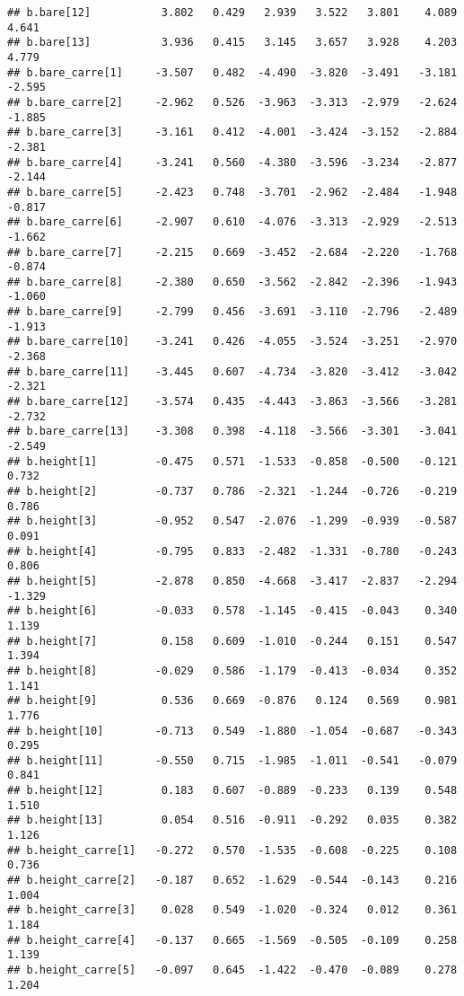 \documentclass[
]{article}
\begin{document}
\begin{verbatim}
## b.bare[12]           3.802   0.429   2.939   3.522   3.801    4.089    4.641
## b.bare[13]           3.936   0.415   3.145   3.657   3.928    4.203    4.779
## b.bare_carre[1]     -3.507   0.482  -4.490  -3.820  -3.491   -3.181   -2.595
## b.bare_carre[2]     -2.962   0.526  -3.963  -3.313  -2.979   -2.624   -1.885
## b.bare_carre[3]     -3.161   0.412  -4.001  -3.424  -3.152   -2.884   -2.381
## b.bare_carre[4]     -3.241   0.560  -4.380  -3.596  -3.234   -2.877   -2.144
## b.bare_carre[5]     -2.423   0.748  -3.701  -2.962  -2.484   -1.948   -0.817
## b.bare_carre[6]     -2.907   0.610  -4.076  -3.313  -2.929   -2.513   -1.662
## b.bare_carre[7]     -2.215   0.669  -3.452  -2.684  -2.220   -1.768   -0.874
## b.bare_carre[8]     -2.380   0.650  -3.562  -2.842  -2.396   -1.943   -1.060
## b.bare_carre[9]     -2.799   0.456  -3.691  -3.110  -2.796   -2.489   -1.913
## b.bare_carre[10]    -3.241   0.426  -4.055  -3.524  -3.251   -2.970   -2.368
## b.bare_carre[11]    -3.445   0.607  -4.734  -3.820  -3.412   -3.042   -2.321
## b.bare_carre[12]    -3.574   0.435  -4.443  -3.863  -3.566   -3.281   -2.732
## b.bare_carre[13]    -3.308   0.398  -4.118  -3.566  -3.301   -3.041   -2.549
## b.height[1]         -0.475   0.571  -1.533  -0.858  -0.500   -0.121    0.732
## b.height[2]         -0.737   0.786  -2.321  -1.244  -0.726   -0.219    0.786
## b.height[3]         -0.952   0.547  -2.076  -1.299  -0.939   -0.587    0.091
## b.height[4]         -0.795   0.833  -2.482  -1.331  -0.780   -0.243    0.806
## b.height[5]         -2.878   0.850  -4.668  -3.417  -2.837   -2.294   -1.329
## b.height[6]         -0.033   0.578  -1.145  -0.415  -0.043    0.340    1.139
## b.height[7]          0.158   0.609  -1.010  -0.244   0.151    0.547    1.394
## b.height[8]         -0.029   0.586  -1.179  -0.413  -0.034    0.352    1.141
## b.height[9]          0.536   0.669  -0.876   0.124   0.569    0.981    1.776
## b.height[10]        -0.713   0.549  -1.880  -1.054  -0.687   -0.343    0.295
## b.height[11]        -0.550   0.715  -1.985  -1.011  -0.541   -0.079    0.841
## b.height[12]         0.183   0.607  -0.889  -0.233   0.139    0.548    1.510
## b.height[13]         0.054   0.516  -0.911  -0.292   0.035    0.382    1.126
## b.height_carre[1]   -0.272   0.570  -1.535  -0.608  -0.225    0.108    0.736
## b.height_carre[2]   -0.187   0.652  -1.629  -0.544  -0.143    0.216    1.004
## b.height_carre[3]    0.028   0.549  -1.020  -0.324   0.012    0.361    1.184
## b.height_carre[4]   -0.137   0.665  -1.569  -0.505  -0.109    0.258    1.139
## b.height_carre[5]   -0.097   0.645  -1.422  -0.470  -0.089    0.278    1.204

\end{verbatim}
\end{document}
